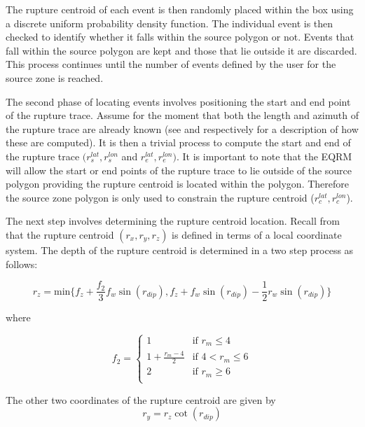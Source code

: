 The rupture centroid of each event is then randomly placed within the box 
using a discrete uniform probability density function. The individual event is then checked to identify whether 
it falls within the source polygon or not. Events that fall within the source polygon 
are kept and those that lie outside it are discarded. This process continues until the number of events 
defined by the user for the source zone is reached.

The second phase of locating events involves positioning the start and end
point of the rupture trace. Assume for the moment that both the
length and azimuth of the rupture trace are already known (see
 and  respectively
for a description of how these are computed). It is then a trivial
process to compute the start and end of the rupture trace
$(r_s^{lat},r_s^{lon}$ and $r_e^{lat},r_e^{lon})$. It is important to note that the EQRM will allow the 
start or end points of the rupture trace to lie outside of the source polygon 
providing the rupture centroid is located within the polygon. Therefore the source zone polygon 
is only used to constrain the rupture centroid ($r_c^{lat},r_c^{lon}$).

The next step involves determining the rupture centroid location.
Recall from  that the rupture centroid
$(r_x,r_y,r_z)$ is defined in terms of a local coordinate system.
The depth of the rupture centroid is determined in a two step
process as follows:

\begin{equation}
r_z = \textrm{min$\{f_z+\frac{f_2}{3}f_w\sin(r_{dip}),
f_z+f_w\sin(r_{dip})-\frac{1}{2}r_w\sin(r_{dip})\}$}
\end{equation}

where

\begin{equation}
f_2 = \left \{ \begin{array}{ll} 1 & \textrm{if $r_m\leq4$} \\
1 + \frac{r_m-4}{2} & \textrm{if $4<r_m\leq6$} \\
2 & \textrm{if $r_m\geq6$} \\
\end{array} \right.
\end{equation}



The other two coordinates of the rupture centroid are given by
\begin{equation}
r_y = r_z\cot(r_{dip})
\end{equation}

